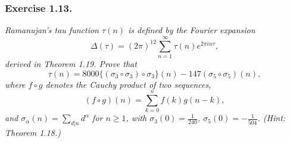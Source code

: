 \documentclass{article}
\begin{document}
\subsubsection*{Exercise 1.13.}
\emph{Ramanujan's tau function $\tau(n)$ is defined by the Fourier expansion
\[
  \Delta(\tau)
  =
  (2\pi)^{12} \sum_{n=1}^{\infty} \tau(n) e^{2\pi i n \tau},
\]
derived in Theorem 1.19.
Prove that
\[
  \tau(n)
  =
  8000 \{ (\sigma_3 \circ \sigma_3) \circ \sigma_3 \}(n)
  - 147( \sigma_5 \circ \sigma_5 )(n),
\]
where $f \circ g$ denotes the Cauchy product of two sequences,
\[
  (f \circ g)(n) = \sum_{k=0}^{n} f(k)g(n-k),
\]
and $\sigma_\alpha(n) = \sum_{d|n} d^{\alpha}$ for $n \geq 1$,
with $\sigma_3(0) = \frac{1}{240}$, $\sigma_5(0) = -\frac{1}{504}$.
(Hint: Theorem 1.18.)} \\
\end{document}

